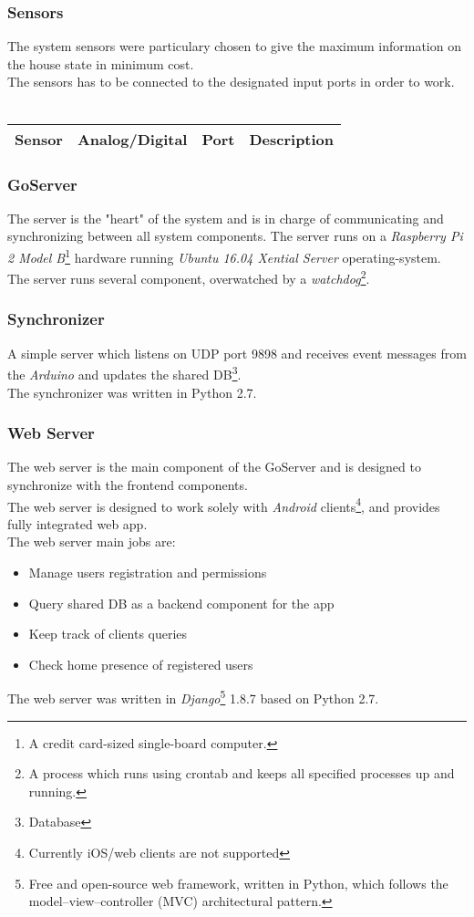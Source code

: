 \documentclass[10pt]{article}
\begin{document}
\subsubsection{Sensors}
The system sensors were particulary chosen to give the maximum information on the house state in minimum cost. \\
The sensors has to be connected to the designated input ports in order to work. \\ \\
\begin{tabular}{| l | l | l | l |}
	\hline
	\textbf{Sensor} & \textbf{Analog/Digital} & \textbf{Port} & \textbf{Description} \\ \hline

\end{tabular}
\subsubsection{GoServer}
The server is the "heart" of the system and is in charge of communicating and synchronizing between all system components.
The server runs on a \emph{Raspberry Pi 2 Model B}\footnote{A credit card-sized single-board computer.} hardware running \emph{Ubuntu 16.04 Xential Server} operating-system. \\
The server runs several component, overwatched by a \emph{watchdog}\footnote{A process which runs using crontab and keeps all specified processes up and running.}. \\
\quad \subsubsection*{Synchronizer}
\quad A simple server which listens on UDP port 9898 and receives event messages from the \emph{Arduino} and updates the shared DB\footnote{Database}. \\
\quad The synchronizer was written in Python 2.7. \\
\quad \subsubsection*{Web Server}
\quad The web server is the main component of the GoServer and is designed to synchronize with the frontend components. \\
\quad The web server is designed to work solely with \emph{Android} clients\footnote{Currently iOS/web clients are not supported}, and provides fully integrated web app. \\
\quad The web server main jobs are:
\begin{itemize}
	\item Manage users registration and permissions
	\item Query shared DB as a backend component for the app
	\item Keep track of clients queries
	\item Check home presence of registered users
\end{itemize}
\quad The web server was written in \emph{Django}\footnote{Free and open-source web framework, written in Python, which follows the model–view–controller (MVC) architectural pattern.} 1.8.7 based on Python 2.7.
\end{document}
